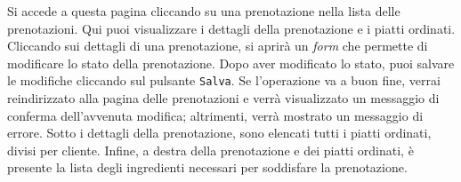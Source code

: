 Si accede a questa pagina cliccando su una prenotazione nella lista delle prenotazioni. Qui puoi visualizzare i dettagli della prenotazione e i piatti ordinati. Cliccando sui dettagli di una prenotazione, si aprirà un \textit{form} che permette di modificare lo stato della prenotazione. Dopo aver modificato lo stato, puoi salvare le modifiche cliccando sul pulsante \texttt{Salva}. Se l'operazione va a buon fine, verrai reindirizzato alla pagina delle prenotazioni e verrà visualizzato un messaggio di conferma dell'avvenuta modifica; altrimenti, verrà mostrato un messaggio di errore. Sotto i dettagli della prenotazione, sono elencati tutti i piatti ordinati, divisi per cliente. Infine, a destra della prenotazione e dei piatti ordinati, è presente la lista degli ingredienti necessari per soddisfare la prenotazione.
